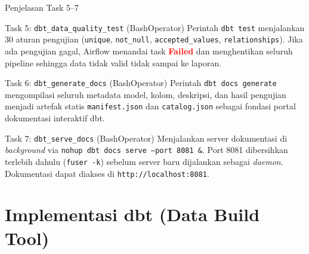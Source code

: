 \documentclass[xcolor=table,t,aspectratio=169]{beamer}
\begin{document}
\begin{frame}{Penjelasan Task 5--7}
  \footnotesize
  \begin{block}{Task 5: \texttt{dbt\_data\_quality\_test} (BashOperator)}
    \scriptsize Perintah \texttt{dbt test} menjalankan 30 aturan pengujian (\texttt{unique}, \texttt{not\_null}, \texttt{accepted\_values}, \texttt{relationships}). Jika ada pengujian gagal, Airflow menandai task \textcolor{red}{\textbf{Failed}} dan menghentikan seluruh pipeline sehingga data tidak valid tidak sampai ke laporan.
  \end{block}
  \vspace{4pt}
  \begin{block}{Task 6: \texttt{dbt\_generate\_docs} (BashOperator)}
    \scriptsize Perintah \texttt{dbt docs generate} mengompilasi seluruh metadata model, kolom, deskripsi, dan hasil pengujian menjadi artefak statis \texttt{manifest.json} dan \texttt{catalog.json} sebagai fondasi portal dokumentasi interaktif dbt.
  \end{block}
  \vspace{4pt}
  \begin{block}{Task 7: \texttt{dbt\_serve\_docs} (BashOperator)}
    \scriptsize Menjalankan server dokumentasi di \textit{background} via \texttt{nohup dbt docs serve --port 8081 \&}. Port 8081 dibersihkan terlebih dahulu (\texttt{fuser -k}) sebelum server baru dijalankan sebagai \textit{daemon}. Dokumentasi dapat diakses di \texttt{http://localhost:8081}.
  \end{block}
\end{frame}

\section{Implementasi dbt (Data Build Tool)}
\end{document}
